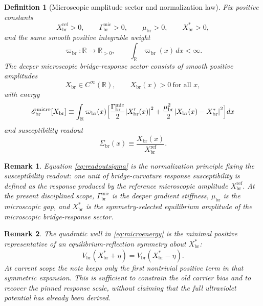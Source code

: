 \documentclass[11pt]{article}
\newcommand{\ProfWeight}{\varpi_{\mathrm{br}}}
\newcommand{\RespSus}{\Sigma_{\mathrm{br}}}
\newcommand{\RespMicro}{X_{\mathrm{br}}}
\newcommand{\RespMicroEq}{X_{\mathrm{br}}^{\ast}}
\newcommand{\RespMicroRef}{X_{\mathrm{br}}^{\mathrm{ref}}}
\newcommand{\RespMicroFluxCoeff}{\Gamma_{\mathrm{br}}^{\mathrm{mic}}}
\newcommand{\RespMicroGap}{\mu_{\mathrm{br}}}
\newcommand{\RespMicroEnergy}{\mathscr E_{\mathrm{br}}^{\mathrm{micro}}}
\newtheorem{definition}{Definition}
\newtheorem{remark}{Remark}
\begin{document}
\begin{definition}[Microscopic amplitude sector and normalization law]
\label{def:micro}
Fix positive constants
\begin{equation}
\RespMicroRef>0,
\qquad
\RespMicroFluxCoeff>0,
\qquad
\RespMicroGap>0,
\qquad
\RespMicroEq>0,
\label{eq:microconstants}
\end{equation}
and the same smooth positive integrable weight
\begin{equation}
\ProfWeight:\mathbb R\to\mathbb R_{>0},
\qquad
\int_{\mathbb R}\ProfWeight(x)\,dx<\infty.
\label{eq:weight}
\end{equation}
The \emph{deeper microscopic bridge-response sector} consists of smooth positive amplitudes
\begin{equation}
\RespMicro\in C^\infty(\mathbb R),
\qquad
\RespMicro(x)>0\ \text{for all }x,
\label{eq:microfield}
\end{equation}
with energy
\begin{equation}
\RespMicroEnergy[\RespMicro]
\equiv
\int_{\mathbb R}\ProfWeight(x)\Bigl[
\frac{\RespMicroFluxCoeff}{2}\abs{\RespMicro'(x)}^2
+
\frac{\RespMicroGap^2}{2}\abs{\RespMicro(x)-\RespMicroEq}^2
\Bigr]dx
\label{eq:microenergy}
\end{equation}
and susceptibility readout
\begin{equation}
\RespSus(x)\equiv\frac{\RespMicro(x)}{\RespMicroRef}.
\label{eq:readoutsigma}
\end{equation}
\end{definition}

\begin{remark}
Equation \eqref{eq:readoutsigma} is the normalization principle fixing the susceptibility readout: one unit of bridge-curvature response susceptibility is defined as the response produced by the reference microscopic amplitude \(\RespMicroRef\). At the present disciplined scope, \(\RespMicroFluxCoeff\) is the deeper gradient stiffness, \(\RespMicroGap\) is the microscopic gap, and \(\RespMicroEq\) is the symmetry-selected equilibrium amplitude of the microscopic bridge-response sector.
\end{remark}

\begin{remark}
The quadratic well in \eqref{eq:microenergy} is the minimal positive representative of an equilibrium-reflection symmetry about \(\RespMicroEq\):
\[
V_{\mathrm{br}}(\RespMicroEq+\eta)=V_{\mathrm{br}}(\RespMicroEq-\eta).
\]
At current scope the note keeps only the first nontrivial positive term in that symmetric expansion. This is sufficient to constrain the old carrier bias and to recover the pinned response scale, without claiming that the full ultraviolet potential has already been derived.
\end{remark}
\end{document}
